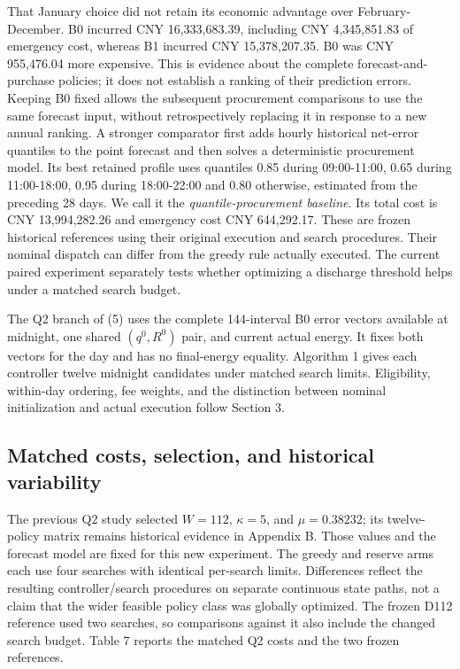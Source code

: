 \par
\endgroup

That January choice did not retain its economic advantage over February-December. B0 incurred CNY 16,333,683.39, including CNY 4,345,851.83 of emergency cost, whereas B1 incurred CNY 15,378,207.35. B0 was CNY 955,476.04 more expensive. This is evidence about the complete forecast-and-purchase policies; it does not establish a ranking of their prediction errors. Keeping B0 fixed allows the subsequent procurement comparisons to use the same forecast input, without retrospectively replacing it in response to a new annual ranking. A stronger comparator first adds hourly historical net-error quantiles to the point forecast and then solves a deterministic procurement model. Its best retained profile uses quantiles 0.85 during 09:00-11:00, 0.65 during 11:00-18:00, 0.95 during 18:00-22:00 and 0.80 otherwise, estimated from the preceding 28 days. We call it the \emph{quantile-procurement baseline}. Its total cost is CNY 13,994,282.26 and emergency cost CNY 644,292.17. These are frozen historical references using their original execution and search procedures. Their nominal dispatch can differ from the greedy rule actually executed. The current paired experiment separately tests whether optimizing a discharge threshold helps under a matched search budget.

The Q2 branch of (5) uses the complete 144-interval B0 error vectors available at midnight, one shared \((q^0,R^0)\) pair, and current actual energy. It fixes both vectors for the day and has no final-energy equality. Algorithm 1 gives each controller twelve midnight candidates under matched search limits. Eligibility, within-day ordering, fee weights, and the distinction between nominal initialization and actual execution follow Section 3.

\subsection{Matched costs, selection, and historical variability}\label{matched-costs-selection-and-historical-variability}

The previous Q2 study selected \(W=112\), \(\kappa=5\), and \(\mu=0.38232\); its twelve-policy matrix remains historical evidence in Appendix B. Those values and the forecast model are fixed for this new experiment. The greedy and reserve arms each use four searches with identical per-search limits. Differences reflect the resulting controller/search procedures on separate continuous state paths, not a claim that the wider feasible policy class was globally optimized. The frozen D112 reference used two searches, so comparisons against it also include the changed search budget. Table 7 reports the matched Q2 costs and the two frozen references.

